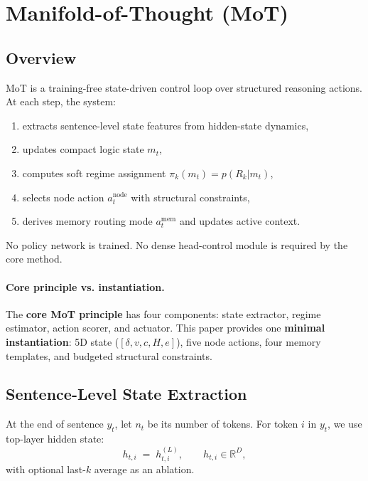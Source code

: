 \documentclass{article}
\newcommand{\R}{\mathbb{R}}
\begin{document}
\section{Manifold-of-Thought (MoT)}
\label{sec:method}

\subsection{Overview}
MoT is a training-free state-driven control loop over structured reasoning actions. At each step, the system:
\begin{enumerate}[leftmargin=1.3em, itemsep=0.2em]
    \item extracts sentence-level state features from hidden-state dynamics,
    \item updates compact logic state $m_t$,
    \item computes soft regime assignment $\pi_k(m_t)=p(R_k|m_t)$,
    \item selects node action $a_t^{\text{node}}$ with structural constraints,
    \item derives memory routing mode $a_t^{\text{mem}}$ and updates active context.
\end{enumerate}

No policy network is trained. No dense head-control module is required by the core method.

\paragraph{Core principle vs. instantiation.}
The \textbf{core MoT principle} has four components: state extractor, regime estimator, action scorer, and actuator.
This paper provides one \textbf{minimal instantiation}: 5D state ($[\delta,v,c,H,e]$), five node actions, four memory templates, and budgeted structural constraints.

\subsection{Sentence-Level State Extraction}
\label{sec:obs}
At the end of sentence $y_t$, let $n_t$ be its number of tokens. 
For token $i$ in $y_t$, we use top-layer hidden state:
\begin{equation}
h_{t,i} \;=\; h^{(L)}_{t,i},
\qquad h_{t,i}\in\R^D,
\label{eq:lastk}
\end{equation}
with optional last-$k$ average as an ablation.
\end{document}
